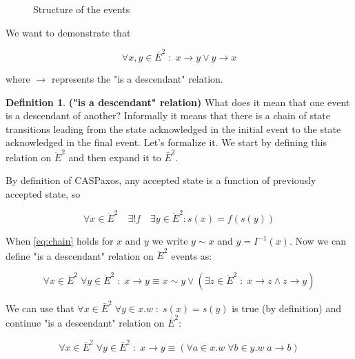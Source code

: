 \documentclass[a4paper,USenglish]{lipics-v2018}
\theoremstyle{definition}
\newtheorem*{mydefinition}{Definition}
\begin{document}
\begin{appendices}
\begin{figure}[!h]
            \caption{Structure of the events}
        \end{figure}
        
        We want to demonstrate that
        
        \begin{equation}
            \forall x,y \in \bar{E}^2 \;:\; x \to y \lor y \to x
        \end{equation}
        
        where $\to$ represents the "is a descendant" relation.
        
        \theoremstyle{definition}
        \begin{mydefinition}{\bf("is a descendant" relation)}
            What does it mean that one event is a descendant of another? Informally it means that there is a chain of state transitions leading from the state acknowledged in the initial event to the state acknowledged in the final event. Let's formalize it. We start by defining this relation on $\ddot{E}^2$ and then expand it to $\bar{E}^2$.
        
            By definition of CASPaxos, any accepted state is a function of previously accepted state, so
        
            \begin{equation} \label{eq:chain}
                \forall x \in \ddot{E}^2 \quad \exists ! f \quad \exists y \in \ddot{E}^2 : s(x) = f(s(y))
            \end{equation}
        
            When \ref{eq:chain} holds for $x$ and $y$ we write $y \sim x$ and $y = I^{-1}(x)$. Now we can define "is a descendant" relation on $\ddot{E}^2$ events as:
        
            \begin{equation}
                \forall x \in \ddot{E}^2 \; \forall y \in \ddot{E}^2 \;:\; x \to y \equiv x \sim y \lor (\exists z \in \ddot{E}^2 \;:\; x \to z \land z \to y)
            \end{equation}
          
            We can use that $\forall x \in \bar{E}^2 \; \forall y \in x.w \;:\; s(x) = s(y)$ is true (by definition) and continue "is a descendant" relation on $\bar{E}^2$:
          
            \begin{equation}
                \forall x \in \bar{E}^2 \; \forall y \in \bar{E}^2 \;:\; x \to y \equiv (\forall a \in x.w \; \forall b \in y.w \; a \to b)
            \end{equation}
        \end{mydefinition}
        

\end{appendices}
\end{document}
